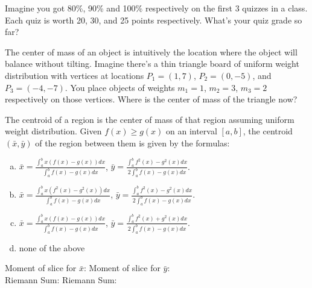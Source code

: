 \documentclass[answers]{exam}
\begin{document}
\begin{questions}
	
\question Imagine you got 80\%, 90\% and 100\% respectively on the first 3 quizzes in a class. Each quiz is worth 20, 30, and 25 points respectively. What's your quiz grade so far?

\hfill \break
\hfill \break
\hfill \break
\hfill \break
\hfill \break

\question The center of mass of an object is intuitively the location where the object will balance without tilting. Imagine there's a thin triangle board of uniform weight distribution with vertices at locations $P_1 = (1, 7)$, $P_2 = (0, -5)$, and $P_3 = (-4, -7)$. You place objects of weights $m_1 = 1$, $m_2 = 3$, $m_3 = 2$ respectively on those vertices. Where is the center of mass of the triangle now?

\hfill \break
\hfill \break
\hfill \break
\hfill \break
\hfill \break
\hfill \break
\hfill \break
\hfill \break
\hfill \break
\hfill \break
\hfill \break

\question The centroid of a region is the center of mass of that region assuming uniform weight distribution. Given $f(x) \geq g(x)$ on an interval $[a, b]$, the centroid $(\bar{x}, \bar{y})$ of the region between them is given by the formulas:

\begin{enumerate}[(a)]
	\item $\displaystyle \bar{x} = \frac{\int_{a}^{b}x(f(x)-g(x))dx}{\int_{a}^{b}f(x)-g(x) dx}$, $\displaystyle \bar{y} = \frac{\int_{a}^{b}f^2(x)-g^2(x)dx}{2\int_{a}^{b}f(x)-g(x) dx}$.
	\item $\displaystyle \bar{x} = \frac{\int_{a}^{b}x(f^2(x)-g^2(x))dx}{\int_{a}^{b}f(x)-g(x) dx}$, $\displaystyle \bar{y} = \frac{\int_{a}^{b}f^2(x)-g^2(x)dx}{2\int_{a}^{b}f(x)-g(x) dx}$.
	\item $\displaystyle \bar{x} = \frac{\int_{a}^{b}x(f(x)-g(x))dx}{\int_{a}^{b}f(x)-g(x) dx}$, $\displaystyle \bar{y} = \frac{\int_{a}^{b}f^2(x)+g^2(x)dx}{2\int_{a}^{b}f(x)-g(x) dx}$.
	\item none of the above
\end{enumerate}

Moment of slice for $\bar{x}$: \hspace{2in} Moment of slice for $\bar{y}$: \\

Riemann Sum:  \hspace{2.44in} Riemann Sum:\\


\end{questions}
\end{document}
